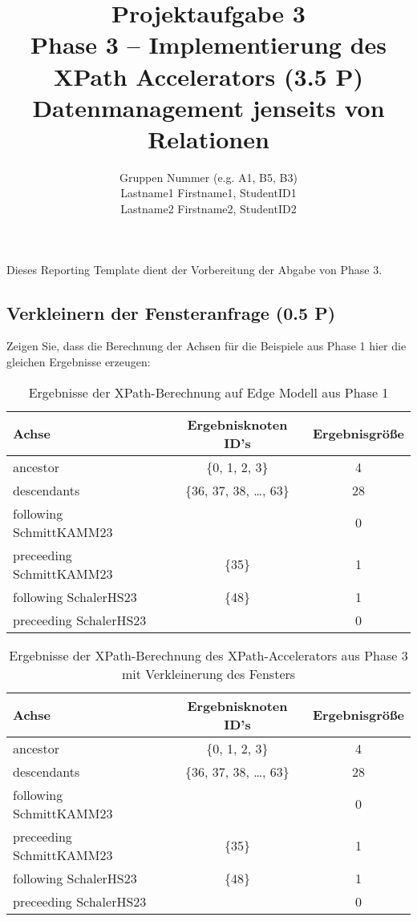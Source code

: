 \documentclass[11pt]{scrartcl}
\title{
  \textbf{\large Projektaufgabe 3 } \\
  Phase 3 – Implementierung des XPath Accelerators (3.5 P) \\
  {\large Datenmanagement jenseits von Relationen}
}
\author{
  Gruppen Nummer (e.g. A1, B5, B3) \\
  \large Lastname1 Firstname1, StudentID1 \\
  \large Lastname2 Firstname2, StudentID2 
}
\begin{document}
\maketitle\thispagestyle{empty}

Dieses Reporting Template dient der Vorbereitung der Abgabe von Phase 3. 

\subsection*{Verkleinern der Fensteranfrage (0.5 P)}

Zeigen Sie, dass die Berechnung der Achsen für die Beispiele aus Phase 1 hier die gleichen Ergebnisse erzeugen:

\begin{table}[h]
	\centering
		\begin{center}
			\begin{tabular}{ l | c c }
				\toprule
				Achse & Ergebnisknoten ID's & Ergebnisgröße\\
				\midrule
				ancestor & \{0, 1, 2, 3\} & 4 \\
				descendants & \{36, 37, 38, \ldots, 63\} & 28 \\
				following SchmittKAMM23 & \emptyset & 0 \\
				preceeding SchmittKAMM23 & \{35\} & 1 \\
				following SchalerHS23 & \{48\} & 1 \\
				preceeding SchalerHS23 & \emptyset & 0 \\
				\bottomrule
			\end{tabular}
			\end{center}
	\caption{Ergebnisse der XPath-Berechnung auf Edge Modell aus Phase 1}
	\label{tab:ErgebnisseDerXPathBerechnug1}
\end{table}

\begin{table}[h]
	\centering
		\begin{center}
			\begin{tabular}{ l | c c }
				\toprule
				Achse & Ergebnisknoten ID's & Ergebnisgröße\\
				\midrule
				ancestor & \{0, 1, 2, 3\} & 4 \\
				descendants & \{36, 37, 38, \ldots, 63\} & 28 \\
				following SchmittKAMM23 & \emptyset & 0 \\
				preceeding SchmittKAMM23 & \{35\} & 1 \\
				following SchalerHS23 & \{48\} & 1 \\
				preceeding SchalerHS23 & \emptyset & 0 \\
				\bottomrule
			\end{tabular}
			\end{center}
	\caption{Ergebnisse der XPath-Berechnung des XPath-Accelerators aus Phase 3 mit Verkleinerung des Fensters}
	\label{tab:ErgebnisseDerXPathBerechnug2}
\end{table}
\end{document}
